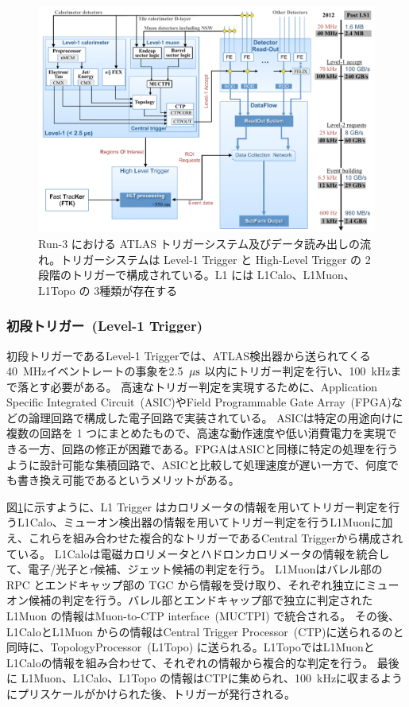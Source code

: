 \begin{figure}[tb]
  \centering
  \includegraphics[clip, width=14cm]{fig/3/trigger-nagare2.pdf}
  \caption{Run-3 における ATLAS トリガーシステム及びデータ読み出しの流れ\cite{article:Run3trigger}。トリガーシステムは Level-1 Trigger と High-Level Trigger の 2 段階のトリガーで構成されている。L1 には L1Calo、L1Muon、L1Topo の 3種類が存在する}
  \label{fig:トリガーの全体像}
\end{figure}

\subsubsection{初段トリガー~(Level-1 Trigger)}\label{L1Topo}
初段トリガーであるLevel-1 Triggerでは、ATLAS検出器から送られてくる40~MHzイベントレートの事象を2.5~$\rm{\mu s}$ 以内にトリガー判定を行い、100~kHzまで落とす必要がある。
高速なトリガー判定を実現するために、Application Specific Integrated Circuit~(ASIC)やField Programmable Gate Array~(FPGA)などの論理回路で構成した電子回路で実装されている。
ASICは特定の用途向けに複数の回路を 1 つにまとめたもので、高速な動作速度や低い消費電力を実現できる一方、回路の修正が困難である。FPGAはASICと同様に特定の処理を行うように設計可能な集積回路で、ASICと比較して処理速度が遅い一方で、何度でも書き換え可能であるというメリットがある。

図\ref{fig:トリガーの全体像}に示すように、L1 Trigger はカロリメータの情報を用いてトリガー判定を行うL1Calo、ミューオン検出器の情報を用いてトリガー判定を行うL1Muonに加え、これらを組み合わせた複合的なトリガーであるCentral Triggerから構成されている。
L1Caloは電磁カロリメータとハドロンカロリメータの情報を統合して、電子/光子と$\tau$候補、ジェット候補の判定を行う。
L1Muonはバレル部の RPC とエンドキャップ部の TGC から情報を受け取り、それぞれ独立にミューオン候補の判定を行う。バレル部とエンドキャップ部で独立に判定された L1Muon の情報はMuon-to-CTP interface~(MUCTPI) で統合される。
その後、L1CaloとL1Muon からの情報はCentral Trigger Processor~(CTP)に送られるのと同時に、TopologyProcessor~(L1Topo) に送られる。L1TopoではL1MuonとL1Caloの情報を組み合わせて、それぞれの情報から複合的な判定を行う。
最後に L1Muon、L1Calo、L1Topo の情報はCTPに集められ、100~kHzに収まるようにプリスケールがかけられた後、トリガーが発行される。

